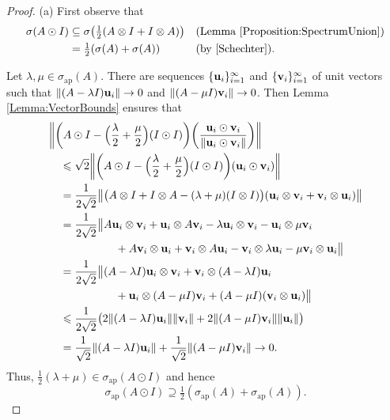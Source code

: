 \documentclass[10pt,reqno]{amsart}
\newcommand{\0}{{\color{lightgray}0}}
\renewcommand{\leq}{\leqslant}
\newcommand{\norm}[1]{\| #1 \|}
\renewcommand{\vec}[1]{{\bf #1}}
\theoremstyle{definition}
\numberwithin{equation}{section}
\begin{document}
\begin{proof}
(a) First observe that
\begin{align*}
\sigma(A\odot I) 
&\subseteq \sigma\big(\tfrac{1}{2} (A\otimes I+I \otimes A) \big) && (\text{Lemma \ref{Proposition:SpectrumUnion}})\\
&= \tfrac{1}{2}(\sigma(A)+\sigma(A)) && (\text{by \cite[Theorem 2.1]{Schechter}}).
\end{align*}

Let $\lambda,\mu \in \sigma_{\textrm{ap}}(A)$.  There are sequences $\{\vec{u}_i\}_{i=1}^{\infty}$ and $\{\vec{v}_i\}_{i=1}^{\infty}$ of unit vectors such that $\norm{(A-\lambda I)\vec{u}_i}\to 0$ and $\norm{(A-\mu I)\vec{v}_i}\to 0$.  Then
Lemma \ref{Lemma:VectorBounds} ensures that
\begin{align}
&\bigg\|\bigg(A\odot I- \Big(\frac{\lambda}{2}+\frac{\mu}{2}\Big)(I\odot I)\bigg)\bigg(\frac{\vec{u}_i\odot \vec{v}_i}{\|\vec{u}_i\odot \vec{v}_i \|}\bigg)\bigg\|\\
&\quad \leq \sqrt{2}\bigg\|\bigg(A\odot I- \Big(\frac{\lambda}{2}+\frac{\mu}{2}\Big)(I\odot I)\bigg) (\vec{u}_i\odot \vec{v}_i) \bigg\|
\\
&\quad= \frac{1}{2\sqrt{2}}\big\| \big(A\otimes I+I \otimes A-(\lambda+\mu)(I\otimes I)\big)(\vec{u}_i\otimes \vec{v}_i+\vec{v}_i\otimes \vec{u}_i) \big\|\\
&\quad= \frac{1}{2\sqrt{2}} \big\|A\vec{u}_i \otimes \vec{v}_i + \vec{u}_i \otimes A \vec{v}_i - \lambda \vec{u}_i \otimes \vec{v}_i - \vec{u}_i \otimes  \mu\vec{v}_i \\
&\qquad\qquad\qquad+ A \vec{v}_i \otimes \vec{u}_i + \vec{v}_i \otimes A \vec{u}_i -  \vec{v}_i \otimes  \lambda\vec{u}_i - \mu \vec{v}_i \otimes \vec{u}_i  \big\| \\
&\quad= \frac{1}{2\sqrt{2}} \big\| (A-\lambda I)\vec{u}_i \otimes \vec{v}_i + \vec{v}_i \otimes (A-\lambda I)\vec{u}_i \\
&\qquad\qquad\qquad + \vec{u}_i\otimes (A-\mu I)\vec{v}_i+ (A-\mu I) (\vec{v}_i \otimes \vec{u}_i) \big\| \\
&\quad\leq\frac{1}{2\sqrt{2}}  \big( 2\norm{(A-\lambda I)\vec{u}_i}\norm{\vec{v}_i} + 2 \norm{(A-\mu I)\vec{v}_i} \norm{\vec{u}_i} \big)\\
&\quad= \frac{1}{\sqrt{2}} \norm{(A-\lambda I)\vec{u}_i} + \frac{1}{\sqrt{2}}\norm{(A-\mu I)\vec{v}_i} \to 0.
\end{align}
Thus, $\frac{1}{2}(\lambda+\mu)\in \sigma_{\textrm{ap}}(A\odot I)$ and hence
\begin{equation}\label{eq:ApproxPointSum}
    \sigma_{\textrm{ap}}(A\odot I) \supseteq \tfrac{1}{2}(\sigma_{\textrm{ap}}(A)+\sigma_{\textrm{ap}}(A)).
\end{equation}


\end{proof}
\end{document}
